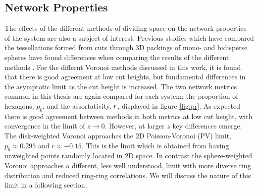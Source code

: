 \subsection{Network Properties}

The effects of the different methods of dividing space on the network properties of the system are also a subject of interest.
Previous studies which have compared the tessellations formed from cuts through 3D packings of mono- and bidisperse spheres have found differences when comparing the results of the different methods \cite{Oger2000,Gervois2004}.
For the differnt Voronoi methods discussed in this work, it is found that there is good agreement at low cut heights, but fundamental differences in the asymptotic limit as the cut height is increased.
The two network metrics common in this thesis are again compared for each system: the proportion of hexagons, $p_6$, and the assortativity, $r$, displayed in figure \ref{fig:pr}.
As expected there is good agreement between methods in both metrics at low cut height, with convergence in the limit of $z\rightarrow 0$.
However, at larger $z$ key differences emerge. 
The disk\--weighted Voronoi approaches the 2D Poisson\--Voronoi (PV) limit, $p_6\approx0.295$ and $r\approx -0.15$.
This is the limit which is obtained from having unweighted points randomly located in 2D space.
In contrast the sphere\--weighted Voronoi approaches a different, less well understood, limit with more diverse ring distribution and reduced ring\--ring correlations. We
will discuss the nature of this limit in a following section.

